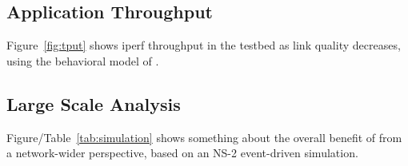 \subsection{Application Throughput}
Figure~\ref{fig:tput} shows iperf throughput in the testbed as link quality
decreases, using the behavioral model of \OurSys. 

\subsection{Large Scale Analysis}
Figure/Table~\ref{tab:simulation} shows something about the overall benefit of \OurSys from a network-wider perspective, based on an NS-2 event-driven simulation.




